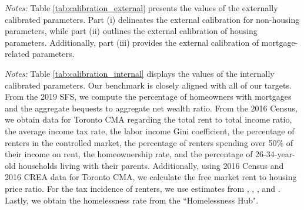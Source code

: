 \documentclass[parskip=full]{article}
\newenvironment{fignote2}[1]
{
\par
\medskip
\begin{minipage}{#1}
\footnotesize
}
{
\end{minipage}
}
\begin{document}



\vspace{1cm}
    
\begin{table}[H]
    \centering
    \caption{Externally assigned parameter values}
    \vspace{-1.25cm}
    \label{tab:calibration_external}
    
    \vspace{-0.5cm}
    \begin{fignote2}{1.11\textwidth}
    \textit{Notes:} Table \ref{tab:calibration_external} presents the values of the externally calibrated parameters. Part (i) delineates the external calibration for non-housing parameters, while part (ii) outlines the external calibration of housing parameters. Additionally, part (iii) provides the external calibration of mortgage-related parameters.
    \end{fignote2}
\end{table}

\begin{table}[H]
    \centering
    \caption{Internally assigned parameter values}
    \vspace{-1.25cm}
    \label{tab:calibration_internal}
    
    \vspace{-0.5cm}
    \begin{fignote2}{1.08\textwidth}
    \textit{Notes:} Table \ref{tab:calibration_internal} displays the values of the internally calibrated parameters. Our benchmark is closely aligned with all of our targets. From the 2019 SFS, we compute the percentage of homeowners with mortgages and the aggregate bequests to aggregate net wealth ratio. From the 2016 Census, we obtain data for Toronto CMA regarding the total rent to total income ratio, the average income tax rate, the labor income Gini coefficient, the percentage of renters in the controlled market, the percentage of renters spending over 50\% of their income on rent, the homeownership rate, and the percentage of 26-34-year-old households living with their parents. Additionally, using 2016 Census and 2016 CREA data for Toronto CMA, we calculate the free market rent to housing price ratio. For the tax incidence of renters, we use estimates from \citet{cy-1994}, \citet{susin-2002}, \citet{fack-2006}, and \citet{sy-2020}. Lastly, we obtain the homelessness rate from the ``Homelessness Hub".
    \end{fignote2}
\end{table}
\end{document}
